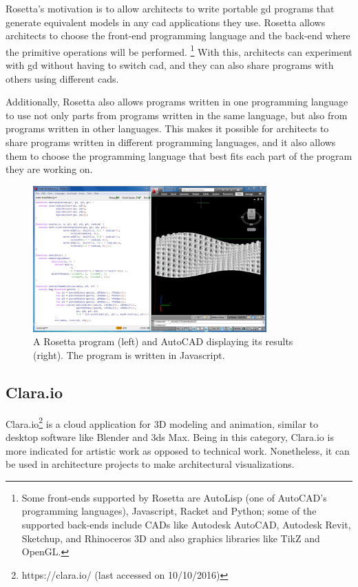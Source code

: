 Rosetta's motivation is to allow architects to write portable \gls{gd} programs that generate equivalent models in any \gls{cad} applications they use.
Rosetta allows architects to choose the front-end programming language and the back-end where the primitive operations will be performed\cite{de2012modern}.%
\footnote{Some front-ends supported by Rosetta are AutoLisp (one of AutoCAD's programming languages), Javascript, Racket and Python; some of the supported back-ends include CADs like Autodesk AutoCAD, Autodesk Revit, Sketchup, and Rhinoceros 3D and also graphics libraries like TikZ and OpenGL.}
With this, architects can experiment with \gls{gd} without having to switch \gls{cad}, and they can also share programs with others using different \glspl{cad}.

Additionally, Rosetta also allows programs written in one programming language to use not only parts from programs written in the same language, but also from programs written in other languages.
This makes it possible for architects to share programs written in different programming languages, and it also allows them to choose the programming language that best fits each part of the program they are working on.

\begin{figure}
	\centering
	\includegraphics[width=0.8\textwidth]{images/rosetta_js_autocad}
	\caption{A Rosetta program (left) and AutoCAD displaying its results (right). The program is written in Javascript.}
	\label{fig:rosetta:ex}
\end{figure}


\subsection{Clara.io}
Clara.io\footnote{https://clara.io/ (last accessed on 10/10/2016)}\cite{houston2013clara} is a cloud application for 3D modeling and animation, similar to desktop software like Blender and 3ds Max.
Being in this category, Clara.io is more indicated for artistic work as opposed to technical work.
Nonetheless, it can be used in architecture projects to make architectural visualizations.

